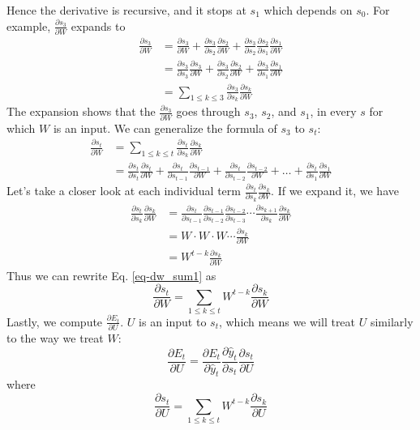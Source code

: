 \documentclass{article}
\begin{document}
Hence the derivative is recursive, and it stops at $s_1$ which depends on $s_0$. For example, $\frac{\partial s_3}{\partial W}$ expands to 
\begin{align}
    \frac{\partial s_3}{\partial W} &= \frac{\partial s_3}{\partial W} + \frac{\partial s_3}{\partial s_2}\frac{\partial s_2}{\partial W} + \frac{\partial s_3}{\partial s_2}\frac{\partial s_2}{\partial s_1}\frac{\partial s_1}{\partial W}\\
    &= \frac{\partial s_3}{\partial s_3}\frac{\partial s_3}{\partial W} + \frac{\partial s_3}{\partial s_2}\frac{\partial s_2}{\partial W} + \frac{\partial s_3}{\partial s_1}\frac{\partial s_1}{\partial W} \\
    &= \sum_{1\leq k \leq 3}\frac{\partial s_3}{\partial s_k}\frac{\partial s_k}{\partial W}
\end{align}
The expansion shows that the $\frac{\partial s_3}{\partial W}$ goes through $s_3$, $s_2$, and $s_1$, in every $s$ for which $W$ is an input. We can generalize the formula of $s_3$ to $s_t$:
\begin{align}
    \frac{\partial s_t}{\partial W} &= \sum_{1\leq k \leq t}\frac{\partial s_t}{\partial s_k}\frac{\partial s_k}{\partial W} \label{eq-dw_sum1}\\
    &= \frac{\partial s_t}{\partial s_t}\frac{\partial s_t}{\partial W} + \frac{\partial s_t}{\partial s_{t-1}}\frac{\partial s_{t-1}}{\partial W} + \frac{\partial s_t}{\partial s_{t-2}}\frac{\partial s_{t-2}}{\partial W} + \dots +  \frac{\partial s_t}{\partial s_1}\frac{\partial s_1}{\partial W}
\end{align}
Let's take a closer look at each individual term $\frac{\partial s_t}{\partial s_k}\frac{\partial s_k}{\partial W}$. If we expand it, we have
\begin{align}
    \frac{\partial s_t}{\partial s_k}\frac{\partial s_k}{\partial W} &= \frac{\partial s_t}{\partial s_{t-1}}\frac{\partial s_{t-1}}{\partial s_{t-2}}\frac{\partial s_{t-2}}{\partial s_{t-3}}\cdots\frac{\partial s_{k+1}}{\partial s_k}\frac{\partial s_k}{\partial W} \\
    &= W\cdot W\cdot W\cdots \frac{\partial s_k}{\partial W} \\
    &= W^{t - k}\frac{\partial s_k}{\partial W}
\end{align}
Thus we can rewrite Eq. \eqref{eq-dw_sum1} as 
\begin{equation}
    \frac{\partial s_t}{\partial W} = \sum_{1\leq k \leq t}W^{t - k}\frac{\partial s_k}{\partial W}    
\end{equation}
Lastly, we compute $\frac{\partial E_t}{\partial U}$. $U$ is an input to $s_t$, which means we will treat $U$ similarly to the way we treat $W$:
\begin{equation}
    \frac{\partial E_t}{\partial U} = \frac{\partial E_t}{\partial \hat{y}_t}\frac{\partial \hat{y}_t}{\partial s_t}\frac{\partial s_t}{\partial U}
\end{equation}
where 
\begin{equation}
    \frac{\partial s_t}{\partial U} = \sum_{1\leq k \leq t}W^{t - k}\frac{\partial s_k}{\partial U}    
\end{equation}
\end{document}
